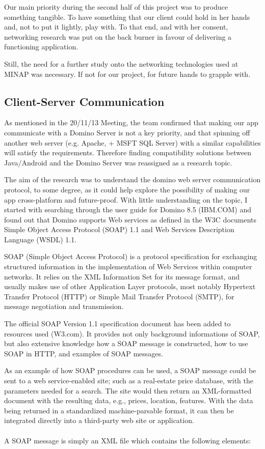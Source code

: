 \documentclass[12pt,a4paper,oneside,titlepage]{article}
\begin{document}
Our main priority during the second half of this project was to produce something tangible. To have something that our client could hold in her hands and, not to put it lightly, play with. To that end, and with her consent, networking research was put on the back burner in favour of delivering a functioning application.

Still, the need for a further study onto the networking technologies used at MINAP was necessary. If not for our project, for future hands to grapple with.

\subsection{Client-Server Communication}
As mentioned in the 20/11/13 Meeting, the team confirmed that making our app communicate with a Domino Server is not a key priority, and that spinning off another web server (e.g. Apache, + MSFT SQL Server) with a similar capabilities will satisfy the requirements. Therefore finding compatibility solutions between Java/Android and the Domino Server was reassigned as a research topic.

The aim of the research was to understand the domino web server communication protocol, to some degree, as it could help explore the possibility of making our app cross-platform and future-proof. With little understanding on the topic, I started with searching through the user guide for Domino 8.5 (IBM.COM) and found out that Domino supports Web services as defined in the W3C documents Simple Object Access Protocol (SOAP) 1.1 and Web Services Description Language (WSDL) 1.1.

SOAP (Simple Object Access Protocol) is a protocol specification for exchanging structured information in the implementation of Web Services within computer networks. It relies on the XML Information Set for its message format, and usually makes use of other Application Layer protocols, most notably Hypertext Transfer Protocol (HTTP) or Simple Mail Transfer Protocol (SMTP), for message negotiation and transmission.

The official SOAP Version 1.1 specification document has been added to resources used (W3.com). It provides not only background informations of SOAP, but also extensive knowledge how a SOAP message is constructed, how to use SOAP in HTTP, and examples of SOAP messages.

As an example of how SOAP procedures can be used, a SOAP message could be sent to a web service-enabled site; such as a real-estate price database, with the parameters needed for a search. The site would then return an XML-formatted document with the resulting data, e.g., prices, location, features. With the data being returned in a standardized machine-parsable format, it can then be integrated directly into a third-party web site or application.
\\ \\
A SOAP message is simply an XML file which contains the following elements:
\end{document}
